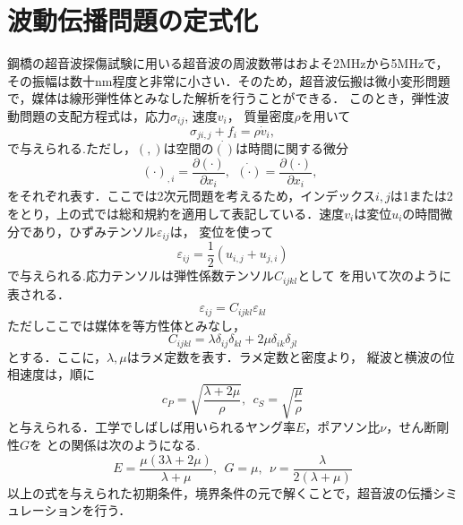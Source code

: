 \section{波動伝播問題の定式化}
鋼橋の超音波探傷試験に用いる超音波の周波数帯はおよそ2MHzから5MHzで，その振幅は数十nm程度と非常に小さい．そのため，超音波伝搬は微小変形問題で，媒体は線形弾性体とみなした解析を行うことができる．
このとき，弾性波動問題の支配方程式は，応力$\sigma_{ij}$, 速度$v_i$，
質量密度$\rho$を用いて
\begin{equation}
	\sigma_{ji,j}+f_i=\rho \dot{v}_i,
	\label{eqn:}
\end{equation}
で与えられる.ただし，$(,)$は空間の$\dot{()}$は時間に関する微分
\begin{equation}
	(\cdot)_{,i}=\frac{\partial (\cdot)}{\partial x_i}, \ \ 
	\dot{(\cdot)}=\frac{\partial (\cdot)}{\partial x_i}, \ \ 
	\label{eqn:}
\end{equation}
をそれぞれ表す．ここでは2次元問題を考えるため，インデックス$i,j$は1または2をとり，上の式では総和規約を適用して表記している．速度$v_i$は変位$u_i$の時間微分であり，ひずみテンソル$\varepsilon_{ij}$は，
変位を使って
\begin{equation}
	\varepsilon_{ij}=\frac{1}{2}(u_{i,j}+u_{j,i})
	\label{eqn:}
\end{equation}
で与えられる.応力テンソルは弾性係数テンソル$C_{ijkl}$として
を用いて次のように表される．
\begin{equation}
	\varepsilon_{ij}=C_{ijkl}\varepsilon_{kl}
	\label{eqn:}
\end{equation}
ただしここでは媒体を等方性体とみなし，
\begin{equation}
	C_{ijkl}=\lambda \delta_{ij}\delta_{kl} +2\mu \delta_{ik}\delta_{jl}
	\label{eqn:}
\end{equation}
とする．ここに，$\lambda, \mu$はラメ定数を表す．ラメ定数と密度より，
縦波と横波の位相速度は，順に
\begin{equation}
	c_{P}=\sqrt{\frac{\lambda + 2\mu}{\rho}}
	, \ \ 
	c_{S}=\sqrt{\frac{\mu}{\rho}}
	\label{eqn:}
\end{equation}
と与えられる．工学でしばしば用いられるヤング率$E$，ポアソン比$\nu$，せん断剛性$G$を
との関係は次のようになる.
\begin{equation}
	E=\frac{\mu(3\lambda + 2\mu )}{\lambda+\mu}, \ \ 
	G=\mu,\ \
	\nu =\frac{\lambda}{2(\lambda+\mu)} 
	\label{eqn:}
\end{equation}
以上の式を与えられた初期条件，境界条件の元で解くことで，超音波の伝播シミュレーションを行う．
